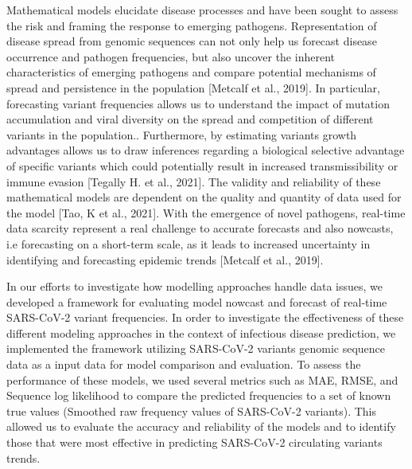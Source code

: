 \documentclass[11pt,oneside,letterpaper]{article}
\begin{document}
Mathematical models elucidate disease processes and have been sought to assess the risk and framing the response to emerging pathogens. 
Representation of disease spread from genomic sequences can not only help us forecast disease occurrence and pathogen frequencies, but also uncover the inherent characteristics of emerging pathogens and compare potential mechanisms of spread and persistence in the population [Metcalf et al., 2019].
In particular, forecasting variant frequencies allows us to understand the impact of mutation accumulation and viral diversity on the spread and competition of different variants in the population.. 
Furthermore, by estimating variants growth advantages allows us to draw inferences regarding a biological selective advantage of specific variants which could potentially result in increased transmissibility or immune evasion [Tegally H. et al., 2021]. 
The validity and reliability of these mathematical models are dependent on the quality and quantity of data used for the model [Tao, K et al., 2021].
With the emergence of novel pathogens, real-time data scarcity represent a real challenge to accurate forecasts and also nowcasts, i.e forecasting on a short-term scale, as it leads to 
increased uncertainty in identifying and forecasting epidemic trends [Metcalf et al., 2019].









In our efforts to investigate how modelling approaches handle data issues, we developed a framework for evaluating model nowcast and forecast of real-time SARS-CoV-2 variant frequencies.
In order to investigate the effectiveness of these different modeling approaches in the context of infectious disease prediction, we implemented the framework utilizing SARS-CoV-2 variants genomic sequence data as a input data for model comparison and evaluation.
To assess the performance of these models, we used several metrics such as MAE, RMSE, and Sequence log likelihood to compare the predicted frequencies to a set of known true values (Smoothed raw frequency values of SARS-CoV-2 variants). %
This allowed us to evaluate the accuracy and reliability of the models and to identify those that were most effective in predicting SARS-CoV-2 circulating variants trends.
\end{document}
